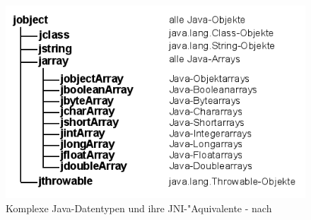 \begin{figure}[h]
\includegraphics[width=\textwidth]{intro/img/jnitypes.png}
\caption{Komplexe Java-Datentypen und ihre JNI-"Aquivalente - nach \cite{JNIHP}}
\label{fig:jnitypes}
\end{figure}


